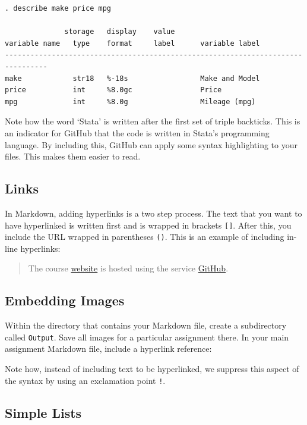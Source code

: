 \documentclass[]{book}
\theoremstyle{definition}
\theoremstyle{definition}
\theoremstyle{definition}
\theoremstyle{remark}
\begin{document}
\begin{verbatim}
. describe make price mpg

              storage   display    value
variable name   type    format     label      variable label
--------------------------------------------------------------------------------
make            str18   %-18s                 Make and Model
price           int     %8.0gc                Price
mpg             int     %8.0g                 Mileage (mpg)
\end{verbatim}

Note how the word `Stata' is written after the first set of triple
backticks. This is an indicator for GitHub that the code is written in
Stata's programming language. By including this, GitHub can apply some
syntax highlighting to your files. This makes them easier to read.

\subsection{Links}\label{links}

In Markdown, adding hyperlinks is a two step process. The text that you
want to have hyperlinked is written first and is wrapped in brackets
\texttt{{[}{]}}. After this, you include the URL wrapped in parentheses
\texttt{()}. This is an example of including in-line hyperlinks:

\begin{quote}
The course \href{https://github.com/slu-soc5050}{website} is hosted
using the service \href{https://github.com}{GitHub}.
\end{quote}

\subsection{Embedding Images}\label{embedding-images}

Within the directory that contains your Markdown file, create a
subdirectory called \texttt{Output}. Save all images for a particular
assignment there. In your main assignment Markdown file, include a
hyperlink reference:

Note how, instead of including text to be hyperlinked, we suppress this
aspect of the syntax by using an exclamation point \texttt{!}.

\subsection{Simple Lists}\label{simple-lists}
\end{document}
